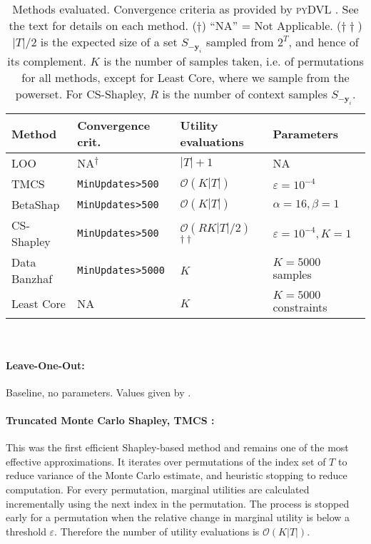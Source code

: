 \documentclass[10pt]{article}
\newcommand{\tmmathbf}[1]{\ensuremath{\boldsymbol{#1}}}
\newcommand{\tmname}[1]{\textsc{#1}}
\newcommand{\tmrsup}[1]{\textsuperscript{#1}}
\newcommand{\python}[1]{\texttt{#1}}
\begin{document}
\begin{table}[h]
  \begin{tabular}{llll}
    {\color[HTML]{000000}Method} & Convergence crit. & Utility evaluations &
    Parameters\\
    \hline
    LOO & NA\tmrsup{$\dagger$} & $|T| + 1$ & NA\\
    TMCS {\citep{ghorbani_data_2019}} & {\small {\python{MinUpdates>500}}} &
    $\mathcal{O} (K|T|)$ & $\varepsilon = 10^{- 4}$\\
    BetaShap {\citep{kwon_beta_2022}} & {\small {\python{MinUpdates>500}}} &
    $\mathcal{O} (K|T|)$ & $\alpha = 16, \beta = 1$\\
    CS-Shapley {\citep{schoch_csshapley_2022}} & {\small
    {\python{MinUpdates>500}}} & $\mathcal{O} (RK|T| / 2)$\tmrsup{$\dagger
    \dagger$} & $\varepsilon = 10^{- 4}, K = 1$\\
    Data Banzhaf {\citep{wang_data_2022}} & {\small
    {\python{MinUpdates>5000}}} & $K$ & $K = 5000$ samples\\
    Least Core {\citep{yan_if_2021}} & NA & $K$ & $K = 5000$ constraints
  \end{tabular} \
  \caption{Methods evaluated. Convergence criteria as provided by
  {\tmname{pyDVL}} {\citep{transferlab_pydvl_2022}}. See the text for
  details on each method. ($\dagger$) ``NA'' = Not Applicable. ($\dagger
  \dagger$) $|T| / 2$ is the expected size of a set $S_{-\tmmathbf{y}_i}$
  sampled from $2^T$, and hence of its complement. $K$ is the number of
  samples taken, i.e. of permutations for all methods, except for Least Core,
  where we sample from the powerset. For CS-Shapley, $R$ is the number of
  context samples $S_{-\tmmathbf{y}_i}$.}
\end{table}

\paragraph{Leave-One-Out:}Baseline, no parameters. Values given by
\Cref{eq:loo}.

\paragraph{Truncated Monte Carlo Shapley, TMCS
{\citep{ghorbani_data_2019}}:}This was the first efficient Shapley-based
method and remains one of the most effective approximations. It iterates over
permutations of the index set of $T$ to reduce variance of the Monte Carlo
estimate, and heuristic stopping to reduce computation. For every permutation,
marginal utilities are calculated incrementally using the next index in the
permutation. The process is stopped early for a permutation when the relative
change in marginal utility is below a threshold $\varepsilon$. Therefore the
number of utility evaluations is $\mathcal{O} (K | T |)$.
\end{document}
